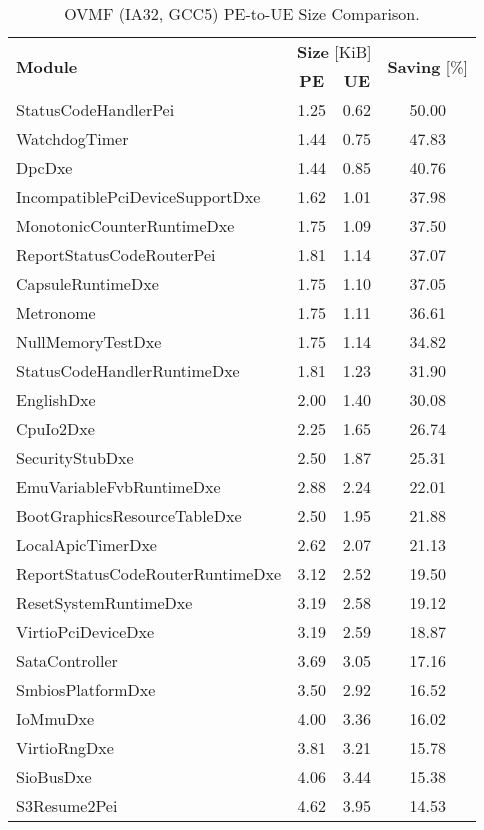 \begin{longtable}{l c c c}
  \caption{OVMF (IA32, GCC5) PE-to-UE Size Comparison.}\\\\
  \toprule
  \multirow{2}{*}[-2pt]{\textbf{Module}} & \multicolumn{2}{c}{\textbf{Size} [KiB]} & \multirow{2}{*}[-2pt]{\textbf{Saving} [\%]}\\
  \cmidrule{2-3}
  & \textbf{PE} & \textbf{UE} &\\
  \midrule
  StatusCodeHandlerPei & 1.25 & 0.62 & 50.00\\
  WatchdogTimer & 1.44 & 0.75 & 47.83\\
  DpcDxe & 1.44 & 0.85 & 40.76\\
  IncompatiblePciDeviceSupportDxe & 1.62 & 1.01 & 37.98\\
  MonotonicCounterRuntimeDxe & 1.75 & 1.09 & 37.50\\
  ReportStatusCodeRouterPei & 1.81 & 1.14 & 37.07\\
  CapsuleRuntimeDxe & 1.75 & 1.10 & 37.05\\
  Metronome & 1.75 & 1.11 & 36.61\\
  NullMemoryTestDxe & 1.75 & 1.14 & 34.82\\
  StatusCodeHandlerRuntimeDxe & 1.81 & 1.23 & 31.90\\
  EnglishDxe & 2.00 & 1.40 & 30.08\\
  CpuIo2Dxe & 2.25 & 1.65 & 26.74\\
  SecurityStubDxe & 2.50 & 1.87 & 25.31\\
  EmuVariableFvbRuntimeDxe & 2.88 & 2.24 & 22.01\\
  BootGraphicsResourceTableDxe & 2.50 & 1.95 & 21.88\\
  LocalApicTimerDxe & 2.62 & 2.07 & 21.13\\
  ReportStatusCodeRouterRuntimeDxe & 3.12 & 2.52 & 19.50\\
  ResetSystemRuntimeDxe & 3.19 & 2.58 & 19.12\\
  VirtioPciDeviceDxe & 3.19 & 2.59 & 18.87\\
  SataController & 3.69 & 3.05 & 17.16\\
  SmbiosPlatformDxe & 3.50 & 2.92 & 16.52\\
  IoMmuDxe & 4.00 & 3.36 & 16.02\\
  VirtioRngDxe & 3.81 & 3.21 & 15.78\\
  SioBusDxe & 4.06 & 3.44 & 15.38\\
  S3Resume2Pei & 4.62 & 3.95 & 14.53\\

\end{longtable}
